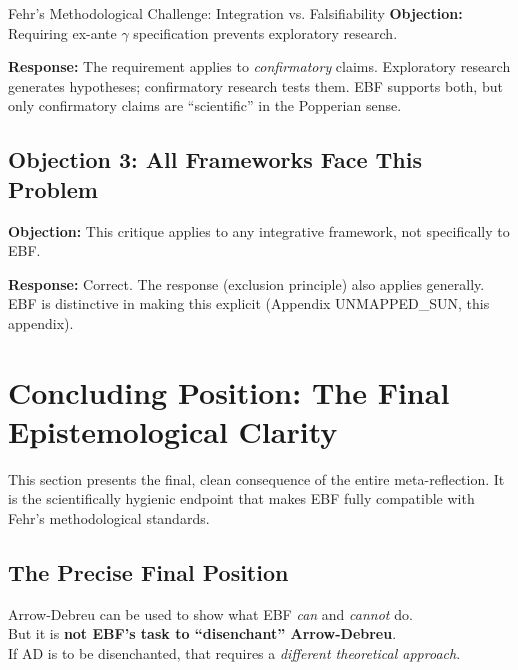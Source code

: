 \begin{chapter}{Fehr's Methodological Challenge: Integration vs. Falsifiability}
\textbf{Objection:} Requiring ex-ante $\gamma$ specification prevents exploratory research.

\textbf{Response:} The requirement applies to \textit{confirmatory} claims. Exploratory research generates hypotheses; confirmatory research tests them. EBF supports both, but only confirmatory claims are ``scientific'' in the Popperian sense.

\subsection{Objection 3: All Frameworks Face This Problem}

\textbf{Objection:} This critique applies to any integrative framework, not specifically to EBF.

\textbf{Response:} Correct. The response (exclusion principle) also applies generally. EBF is distinctive in making this explicit (Appendix UNMAPPED_SUN, this appendix).


\section{Concluding Position: The Final Epistemological Clarity}
\label{sec:conclusion}

This section presents the final, clean consequence of the entire meta-reflection.
It is the scientifically hygienic endpoint that makes EBF fully compatible with Fehr's
methodological standards.

\subsection{The Precise Final Position}

\begin{tcolorbox}[colback=blue!10!white,colframe=blue!75!black,title=\textbf{The Core Statement}]
\begin{center}
\large
Arrow-Debreu can be used to show what EBF \textit{can} and \textit{cannot} do.\\[0.5em]
But it is \textbf{not EBF's task to ``disenchant'' Arrow-Debreu}.\\[0.5em]
If AD is to be disenchanted, that requires a \textit{different theoretical approach}.
\end{center}
\end{tcolorbox}


\end{chapter}
